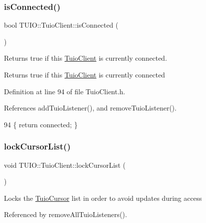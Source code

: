 \subsubsection{\texorpdfstring{is\+Connected()}{isConnected()}}
{\footnotesize\ttfamily bool T\+U\+I\+O\+::\+Tuio\+Client\+::is\+Connected (\begin{DoxyParamCaption}{ }\end{DoxyParamCaption})\hspace{0.3cm}{\ttfamily [inline]}}

Returns true if this \hyperlink{class_t_u_i_o_1_1_tuio_client}{Tuio\+Client} is currently connected. \begin{DoxyReturn}{Returns}
true if this \hyperlink{class_t_u_i_o_1_1_tuio_client}{Tuio\+Client} is currently connected 
\end{DoxyReturn}


Definition at line 94 of file Tuio\+Client.\+h.



References add\+Tuio\+Listener(), and remove\+Tuio\+Listener().


\begin{DoxyCode}
94 \{ \textcolor{keywordflow}{return} connected; \}
\end{DoxyCode}
\mbox{\label{class_t_u_i_o_1_1_tuio_client_a1b7325f668a1bf9e8edab35141050daa}} 
\subsubsection{\texorpdfstring{lock\+Cursor\+List()}{lockCursorList()}}
{\footnotesize\ttfamily void T\+U\+I\+O\+::\+Tuio\+Client\+::lock\+Cursor\+List (\begin{DoxyParamCaption}{ }\end{DoxyParamCaption})}

Locks the \hyperlink{class_t_u_i_o_1_1_tuio_cursor}{Tuio\+Cursor} list in order to avoid updates during access 

Referenced by remove\+All\+Tuio\+Listeners().

\mbox{\label{class_t_u_i_o_1_1_tuio_client_ac10760832bf25e758756a17cd9b5d71b}} 
